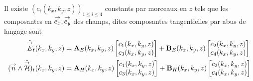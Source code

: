       \begin{prop}
          Il existe \((c_i(k_x,k_y,z))_{1\le i \le4}\) constants par morceaux en \(z\) tels que les composantes en \({\overset{\rightarrow}{e_x}},{\overset{\rightarrow}{e_y}}\) des champs, dites composantes tangentielles par abus de langage sont
          \begin{align*}
              \hat{{\overset{\rightarrow}{E}}}_t(k_x,k_y,z) &= \mathbf{A}_E(k_x,k_y,z) \begin{bmatrix}c_1(k_x,k_y,z) \\ c_3(k_x,k_y,z)\end{bmatrix} + \mathbf{B}_E(k_x,k_y,z) \begin{bmatrix}c_2(k_x,k_y,z) \\ c_4(k_x,k_y,z)\end{bmatrix}
              \\
              ({\overset{\rightarrow}{n}} \wedge \hat{{\overset{\rightarrow}{\mathcal{H}}}})_t(k_x,k_y,z) &= \mathbf{A}_H(k_x,k_y,z) \begin{bmatrix}c_1(k_x,k_y,z) \\ c_3(k_x,k_y,z)\end{bmatrix} + \mathbf{B}_H(k_x,k_y,z) \begin{bmatrix}c_2(k_x,k_y,z) \\ c_4(k_x,k_y,z)\end{bmatrix}
          \end{align*}
      \end{prop}

